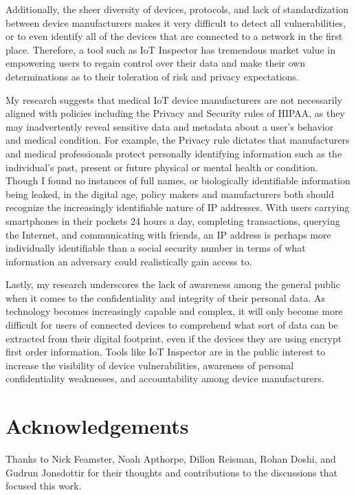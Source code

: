 Additionally, the sheer diversity of devices, protocols, and lack of standardization between device manufacturers makes it very difficult to detect all vulnerabilities, or to even identify all of the devices that are connected to a network in the first place. Therefore, a tool such as IoT Inspector has tremendous market value in empowering users to regain control over their data and make their own determinations as to their toleration of risk and privacy expectations. 

My research suggests that medical IoT device manufacturers are not necessarily aligned with policies including the Privacy and Security rules of HIPAA, as they may inadvertently reveal sensitive data and metadata about a user's behavior and medical condition. For example, the Privacy rule dictates that manufacturers and medical professionals protect personally identifying information such as the individual’s past, present or future physical or mental health or condition. Though I found no instances of full names, or biologically identifiable information being leaked, in the digital age, policy makers and manufacturers both should recognize the increasingly identifiable nature of IP addresses. With users carrying smartphones in their pockets 24 hours a day, completing transactions, querying the Internet, and communicating with friends, an IP address is perhaps more individually identifiable than a social security number in terms of what information an adversary could realistically gain access to. 

Lastly, my research underscores the lack of awareness among the general public when it comes to the confidentiality and integrity of their personal data. As technology becomes increasingly capable and complex, it will only become more difficult for users of connected devices to comprehend what sort of data can be extracted from their digital footprint, even if the devices they are using encrypt first order information. Tools like IoT Inspector are in the public interest to increase the visibility of device vulnerabilities, awareness of personal confidentiality weaknesses, and accountability among device manufacturers.

\appendix

\section*{Acknowledgements}
Thanks to Nick Feamster, Noah Apthorpe, Dillon Reisman, Rohan Doshi, and Gudrun Jonsdottir for their thoughts and contributions to the discussions that focused this work. 
